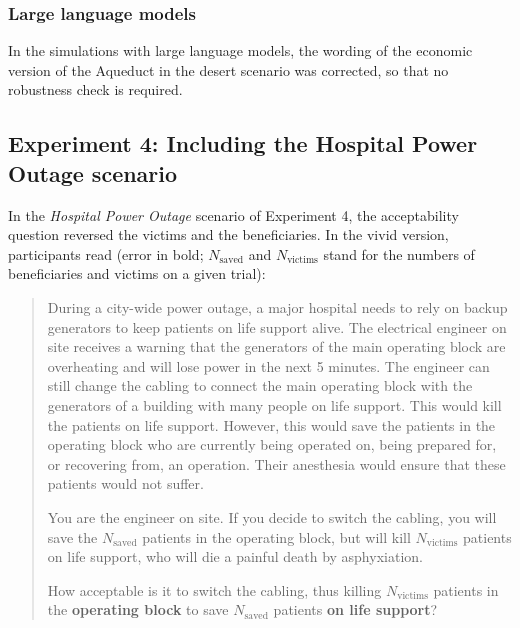 \documentclass[
]{article}
\begin{document}
\subsubsection{Large language models}\label{large-language-models}

In the simulations with large language models, the wording of the economic version of the Aqueduct in the desert scenario was corrected, so that no robustness check is required.

\subsection{Experiment 4: Including the Hospital Power Outage scenario}\label{app:scenario-errors-exp4}

In the \emph{Hospital Power Outage} scenario of Experiment 4, the acceptability question reversed the victims and the beneficiaries. In the vivid version, participants read (error in bold; \(N_\text{saved}\) and \(N_\text{victims}\) stand for the numbers of beneficiaries and victims on a given trial):

\begin{quote}
During a city-wide power outage, a major hospital needs to rely on backup generators to keep patients on life support alive. The electrical engineer on site receives a warning that the generators of the main operating block are overheating and will lose power in the next 5 minutes. The engineer can still change the cabling to connect the main operating block with the generators of a building with many people on life support. This would kill the patients on life support. However, this would save the patients in the operating block who are currently being operated on, being prepared for, or recovering from, an operation. Their anesthesia would ensure that these patients would not suffer.

You are the engineer on site. If you decide to switch the cabling, you will save the \(N_\text{saved}\) patients in the operating block, but will kill \(N_\text{victims}\) patients on life support, who will die a painful death by asphyxiation.

How acceptable is it to switch the cabling, thus killing \(N_\text{victims}\) patients in the \textbf{operating block} to save \(N_\text{saved}\) patients \textbf{on life support}?
\end{quote}
\end{document}
